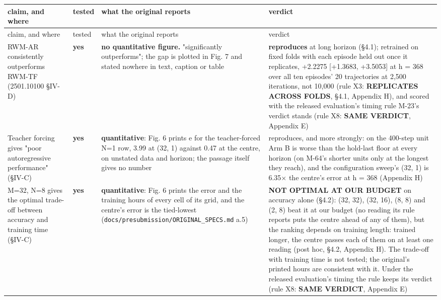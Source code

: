\documentclass[10pt]{article}
\begin{document}
\begingroup\small
\begin{longtable}{>{\raggedright\arraybackslash}p{}>{\raggedright\arraybackslash}p{}>{\raggedright\arraybackslash}p{}>{\raggedright\arraybackslash}p{}}
\toprule claim, and where & tested & what the original reports & verdict \\ \midrule\endfirsthead
\toprule claim, and where & tested & what the original reports & verdict \\ \midrule\endhead
\bottomrule\endlastfoot
RWM-AR consistently outperforms RWM-TF (2501.10100 \S{}IV-D) & \textbf{yes} & \textbf{no quantitative figure.} "significantly outperforms"; the gap is plotted in Fig. 7 and stated nowhere in text, caption or table & \textbf{reproduces} at long horizon (\S{}4.1); retrained on fixed folds with each episode held out once it replicates, +2.2275 [+1.3683, +3.5053] at h = 368 over all ten episodes' 20 trajectories at 2,500 iterations, not 10,000 (rule X3: \textbf{REPLICATES ACROSS FOLDS}, \S{}4.1, Appendix H), and scored with the released evaluation's timing rule M-23's verdict stands (rule X8: \textbf{SAME VERDICT}, Appendix E) \\
Teacher forcing gives "poor autoregressive performance" (\S{}IV-C) & \textbf{yes} & \textbf{quantitative}: Fig. 6 prints e for the teacher-forced N=1 row, 3.99 at (32, 1) against 0.47 at the centre, on unstated data and horizon; the passage itself gives no number & reproduces, and more strongly: on the 400-step unit Arm B is worse than the hold-last floor at every horizon (on M-64's shorter units only at the longest they reach), and the configuration sweep's (32, 1) is 6.35$\times$ the centre's error at h = 368 (Appendix H) \\
M=32, N=8 gives the optimal trade-off between accuracy and training time (\S{}IV-C) & \textbf{yes} & \textbf{quantitative}: Fig. 6 prints the error and the training hours of every cell of its grid, and the centre's error is the tied-lowest (\texttt{docs/\allowbreak{}presubmission/\allowbreak{}ORIGINAL\_\allowbreak{}SPECS\allowbreak{}.md} a.5) & \textbf{NOT OPTIMAL AT OUR BUDGET} on accuracy alone (\S{}4.2): (32, 32), (32, 16), (8, 8) and (2, 8) beat it at our budget (no reading its rule reports puts the centre ahead of any of them), but the ranking depends on training length: trained longer, the centre passes each of them on at least one reading (post hoc, \S{}4.2, Appendix H). The trade-off with training time is not tested; the original's printed hours are consistent with it. Under the released evaluation's timing the rule keeps its verdict (rule X8: \textbf{SAME VERDICT}, Appendix E) \\

\end{longtable}
\end{document}
